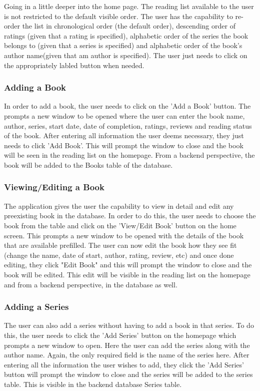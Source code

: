 \documentclass{article}
\begin{document}
Going in a little deeper into the home page. The reading list available to the
user is not restricted to the default visible order. The user has the capability
to re-order the list in chronological order (the default order), descending
order of ratings (given that a rating is specified), alphabetic order of the
series the book belongs to (given that a series is specified) and alphabetic
order of the book's author name(given that am author is specified). The user
just needs to click on the appropriately labled button when needed.

\subsubsection*{Adding a Book}

In order to add a book, the user needs to click on the 'Add a Book' button. The
prompts a new window to be opened where the user can enter the book name,
author, series, start date, date of completion, ratings, reviews and reading
status of the book. After entering all information the user deems necessary,
they just needs to click 'Add Book'. This will prompt the window to close and
the book will be seen in the reading list on the homepage. From a backend
perspective, the book will be added to the Books table of the database.

\subsubsection*{Viewing/Editing a Book}

The application gives the user the capability to view in detail and edit any
preexisting book in the database. In order to do this, the user needs to choose
the book from the table and click on the 'View/Edit Book' button on the home
screen. This prompts a new window to be opened with the details of the book that
are available prefilled. The user can now edit the book how they see fit (change
the name, date of start, author, rating, review, etc) and once done editing,
they click "Edit Book" and this will prompt the window to close and the book
will be edited. This edit will be visible in the reading list on the homepage and
from a backend perspective, in the database as well.

\subsubsection*{Adding a Series}

The user can also add a series without having to add a book in that series. To
do this, the user needs to click the 'Add Series' button on the homepage which
prompts a new window to open. Here the user can add the series along with the
author name. Again, the only required field is the name of the series
here. After entering all the information the user wishes to add, they click the
'Add Series' button will prompt the window to close and the series will be added
to the series table. This is visible in the backend database Series table.
\end{document}
